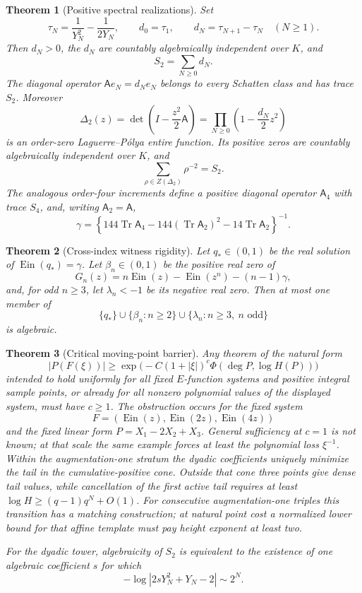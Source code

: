 \documentclass[11pt]{article}
\theoremstyle{keio}
\newtheorem{theorem}{Theorem}[section]
\theoremstyle{definition}
\theoremstyle{remark}
\newcommand{\Ein}{\operatorname{Ein}}
\newcommand{\Tr}{\operatorname{Tr}}
\begin{document}
\begin{theorem}[Positive spectral realizations]
\label{thm:intro-positive}
Set
\[
 \tau_N=\frac1{Y_N^2}-\frac1{2Y_N},\qquad
 d_0=\tau_1,\qquad d_N=\tau_{N+1}-\tau_N\quad(N\ge1).
\]
Then \(d_N>0\), the \(d_N\) are countably algebraically independent over
\(K\), and
\[
 S_2=\sum_{N\ge0}d_N.
\]
The diagonal operator \(\mathsf A e_N=d_Ne_N\) belongs to every Schatten
class and has trace \(S_2\).  Moreover
\[
 \Delta_2(z)=\det\!\left(I-\frac{z^2}{2}\mathsf A\right)
 =\prod_{N\ge0}\left(1-\frac{d_N}{2}z^2\right)
\]
is an order-zero Laguerre--P\'olya entire function.  Its positive zeros are
countably algebraically independent over \(K\), and
\[
 \sum_{\rho\in Z(\Delta_2)}\rho^{-2}=S_2.
\]
The analogous order-four increments define a positive diagonal operator
\(\mathsf A_4\) with trace \(S_4\), and, writing
\(\mathsf A_2=\mathsf A\),
\[
 \gamma=
 \left\{144\Tr\mathsf A_4
 -144(\Tr\mathsf A_2)^2-14\Tr\mathsf A_2\right\}^{-1}.
\]
\end{theorem}

\begin{theorem}[Cross-index witness rigidity]
\label{thm:intro-witness}
Let \(q_*\in(0,1)\) be the real solution of \(\Ein(q_*)=\gamma\).  Let
\(\beta_n\in(0,1)\) be the positive real zero of
\[
 G_n(z)=n\Ein(z)-\Ein(z^n)-(n-1)\gamma,
\]
and, for odd \(n\ge3\), let \(\lambda_n<-1\) be its negative real zero.
Then at most one member of
\[
 \{q_*\}\cup\{\beta_n:n\ge2\}
 \cup\{\lambda_n:n\ge3,\ n\text{ odd}\}
\]
is algebraic.
\end{theorem}

\begin{theorem}[Critical moving-point barrier]
\label{thm:intro-barrier}
Any theorem of the natural form
\[
 |P(F(\xi))|\ge
 \exp\!\bigl(-C(1+|\xi|)^c\Phi(\deg P,\log H(P))\bigr)
\]
intended to hold uniformly for all fixed \(E\)-function systems and positive
integral sample points, or already for all nonzero polynomial values of the
displayed system, must have \(c\ge1\).  The obstruction occurs for the fixed
system
\[
 F=(\Ein(z),\Ein(2z),\Ein(4z))
\]
and the fixed linear form \(P=X_1-2X_2+X_3\).  General sufficiency at
\(c=1\) is not known; at that scale the same example forces at least the
polynomial loss \(\xi^{-1}\).  Within the augmentation-one stratum the
dyadic coefficients uniquely minimize the tail in the cumulative-positive
cone.  Outside that cone three points give dense tail values, while
cancellation of the first active tail requires at least
\(\log H\ge(q-1)q^N+O(1)\).  For consecutive augmentation-one triples this
transition has a matching construction; at natural point cost a normalized
lower bound for that affine template must pay height exponent at least two.

For the dyadic tower, algebraicity of \(S_2\) is
equivalent to the existence of one algebraic coefficient \(s\) for which
\[
 -\log|2sY_N^2+Y_N-2|\sim2^N.
\]
\end{theorem}
\end{document}

